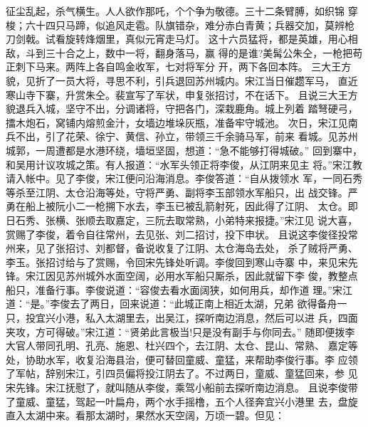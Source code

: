 征尘乱起，杀气横生。人人欲作那吒，个个争为敬德。三十二条臂膊，如织锦
穿梭；六十四只马蹄，似追风走雹。队旗错杂，难分赤白青黄；兵器交加，莫辨枪
刀剑戟。试看旋转烽烟里，真似元宵走马灯。
这十六员猛将，都是英雄，用心相敌，斗到三十合之上，数中一将，翻身落马，赢
得的是谁?美髯公朱仝，一枪把苟正刺下马来。两阵上各自鸣金收军，七对将军分
开，两下各回本阵。
三大王方貌，见折了一员大将，寻思不利，引兵退回苏州城内。宋江当日催趱军马，
直近寒山寺下寨，升赏朱仝。裴宣写了军状，申复张招讨，不在话下。
且说三大王方貌退兵入城，坚守不出，分调诸将，守把各门，深栽鹿角。城上列着
踏弩硬弓，擂木炮石，窝铺内熔煎金汁，女墙边堆垛灰瓶，准备牢守城池。
次日，宋江见南兵不出，引了花荣、徐宁、黄信、孙立，带领三千余骑马军，前来
看城。见苏州城郭，一周遭都是水港环绕，墙垣坚固，想道：“急不能够打得城破。”
回到寨中，和吴用计议攻城之策。有人报道：“水军头领正将李俊，从江阴来见主
将。”宋江教请入帐中。见了李俊，宋江便问沿海消息。李俊答道：“自从拨领水
军，一同石秀等杀至江阴、太仓沿海等处，守将严勇、副将李玉部领水军船只，出
战交锋。严勇在船上被阮小二一枪搠下水去，李玉已被乱箭射死，因此得了江阴、
太仓。即日石秀、张横、张顺去取嘉定，三阮去取常熟，小弟特来报捷。”宋江见
说大喜，赏赐了李俊，着令自往常州，去见张、刘二招讨，投下申状。
且说这李俊径投常州来，见了张招讨、刘都督，备说收复了江阴、太仓海岛去处，
杀了贼将严勇、李玉。张招讨给与了赏赐，令回宋先锋处听调。李俊回到寒山寺寨
中，来见宋先锋。宋江因见苏州城外水面空阔，必用水军船只厮杀，因此就留下李
俊，教整点船只，准备行事。李俊说道：“容俊去看水面阔狭，如何用兵，却作道
理。”宋江道：“是。”李俊去了两日，回来说道：“此城正南上相近太湖，兄弟
欲得备舟一只，投宜兴小港，私入太湖里去，出吴江，探听南边消息，然后可以进
兵，四面夹攻，方可得破。”宋江道：“贤弟此言极当!只是没有副手与你同去。”
随即便拨李大官人带同孔明、孔亮、施恩、杜兴四个，去江阴、太仓、昆山、常熟、
嘉定等处，协助水军，收复沿海县治，便可替回童威、童猛，来帮助李俊行事。李
应领了军帖，辞别宋江，引四员偏将投江阴去了。不过两日，童威、童猛回来，参
见宋先锋。宋江抚慰了，就叫随从李俊，乘驾小船前去探听南边消息。
且说李俊带了童威、童猛，驾起一叶扁舟，两个水手摇橹，五个人径奔宜兴小港里
去，盘旋直入太湖中来。看那太湖时，果然水天空阔，万顷一碧。但见：

